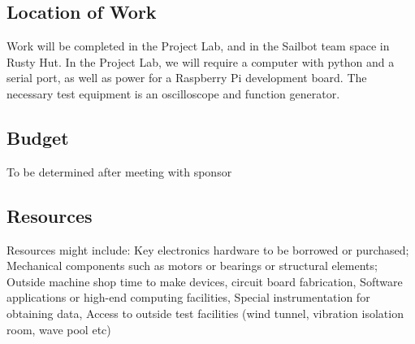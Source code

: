 \subsection{\label{sec:location-of-word}Location of Work}
Work will be completed in the Project Lab, and in the Sailbot team space in Rusty Hut. In the Project Lab, we will require a computer with python and a serial port, as well as power for a Raspberry Pi development board. The necessary test equipment is an oscilloscope and function generator.

\subsection{\label{sec:budget}Budget}
To be determined after meeting with sponsor

\subsection{\label{sec:resources}Resources}
Resources might include:
    Key electronics hardware to be borrowed or purchased;
    Mechanical components such as motors or bearings or structural elements;
    Outside machine shop time to make devices, circuit board fabrication,
    Software applications or high-end computing facilities,
    Special instrumentation for obtaining data,
    Access to outside test facilities (wind tunnel, vibration isolation room, wave pool etc)
